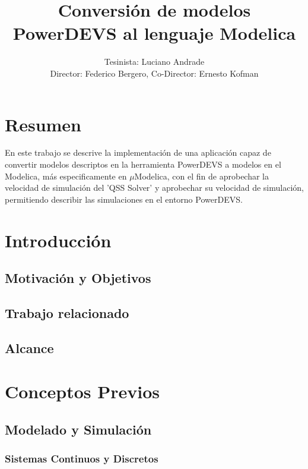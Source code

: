 \documentclass[a4paper,	11pt]{article}
\begin{document}
\renewcommand\floatpagefraction{.9}
\renewcommand\topfraction{.9}
\renewcommand\bottomfraction{.9}
\renewcommand\textfraction{.1}
\setcounter{totalnumber}{50}
\setcounter{topnumber}{50}
\setcounter{bottomnumber}{50}

\title{Conversión de modelos PowerDEVS al lenguaje Modelica}
\author{Tesinista: Luciano Andrade \\ Director: Federico Bergero, Co-Director: Ernesto Kofman} 

\maketitle
\section{Resumen}
En este trabajo se descrive la implementación de una aplicación capaz de convertir modelos descriptos en la herramienta PowerDEVS a modelos en el Modelica, más especificamente en $\mu$Modelica, con el fin de aprobechar la velocidad de simulación del 'QSS Solver' y aprobechar su velocidad de simulación, permitiendo describir las simulaciones en el entorno PowerDEVS.


\section{Introducción}
\subsection{Motivación y Objetivos}
\subsection{Trabajo relacionado}
\subsection{Alcance}

\section{Conceptos Previos}
\subsection{Modelado y Simulación}
\subsubsection{Sistemas Continuos y Discretos}
\end{document}
